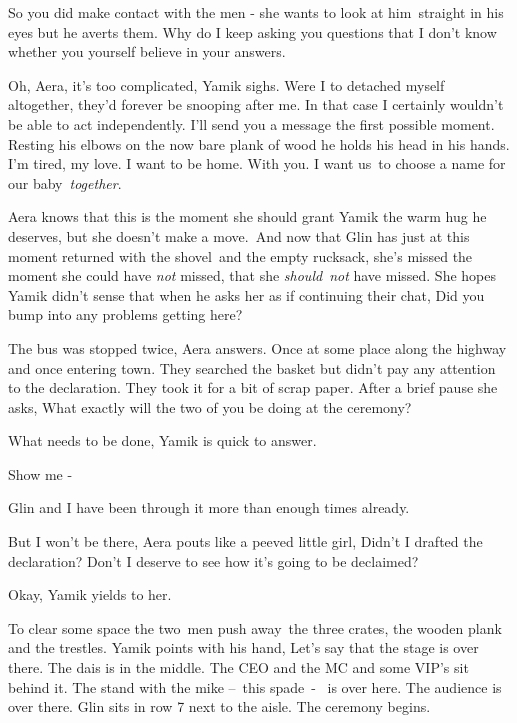 \documentclass[twoside,11pt]{book}
\begin{document}
{\textquotedbl}So you did make contact with the men -{\textquotedbl} she wants to look at
him{\ }straight in his eyes but he averts them. {\textquotedbl}Why do I keep
asking you questions that I don't know whether you yourself believe in your answers.{\textquotedbl} 

{\textquotedbl}Oh, Aera, it's too complicated,{\textquotedbl} Yamik sighs. {\textquotedbl}Were I to detached myself
altogether, they'd forever be snooping after me. In that case I certainly wouldn't be able to act independently. I'll
send you a message the first possible moment.{\textquotedbl} Resting his elbows on the now bare plank of wood he holds
his head in his hands. {\textquotedbl}I'm tired, my love. I want to be home. With you. I want
us{\ }to choose a name for our baby\ \textit{together}.{\textquotedbl} 

Aera knows that this is the moment she should grant Yamik the warm hug he deserves, but she doesn't make a move.\ And
now that Glin has just at this moment returned with the shovel\ and the empty rucksack, she's missed the moment she
could have \textit{not} missed, that she \textit{should}\ \textit{not} have missed. She hopes Yamik didn't sense that
when he asks her as if continuing their chat, {\textquotedbl}Did you bump into any problems getting
here?{\textquotedbl} 

{\textquotedbl}The bus was stopped twice,{\textquotedbl} Aera answers. {\textquotedbl}Once at some place along the
highway and once entering town. They searched the basket but didn't pay any attention to the declaration. They took it
for a bit of scrap paper.{\textquotedbl} After a brief pause she asks, {\textquotedbl}What exactly will the two of you
be doing at the ceremony?{\textquotedbl} 

{\textquotedbl}What needs to be done,{\textquotedbl} Yamik is quick to answer. 

{\textquotedbl}Show me -{\textquotedbl} 

{\textquotedbl}Glin and I have been through it more than enough times already.{\textquotedbl} 

{\textquotedbl}But I won't be there,{\textquotedbl} Aera pouts like a peeved little girl, {\textquotedbl}Didn't I
drafted the declaration? Don't I deserve to see how it's going to be declaimed?{\textquotedbl} 

{\textquotedbl}Okay,{\textquotedbl} Yamik yields to her.\ 

To clear some space the two\  men push away\ the three crates, the wooden plank and the
trestles{.} Yamik points with his hand, {\textquotedbl}Let's say that the stage
is over there. The dais is in the middle. The CEO and the MC and some VIP's sit behind it. The stand with the mike
--\ this spade\ {}- ~is over here. The audience is over there. Glin sits in row 7 next to the aisle. The ceremony
begins.{\textquotedbl} 
\end{document}
